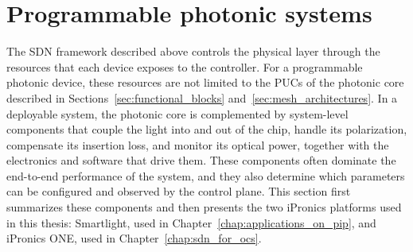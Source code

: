 %


%

\section{Programmable photonic systems}\label{sub:pip_systems}
The SDN framework described above controls the physical layer through the resources that each device exposes to the controller.
For a programmable photonic device, these resources are not limited to the PUCs of the photonic core described in Sections~\ref{sec:functional_blocks} and~\ref{sec:mesh_architectures}.
In a deployable system, the photonic core is complemented by system-level components that couple the light into and out of the chip, handle its polarization, compensate its insertion loss, and monitor its optical power, together with the electronics and software that drive them.
These components often dominate the end-to-end performance of the system, and they also determine which parameters can be configured and observed by the control plane.
This section first summarizes these components and then presents the two iPronics platforms used in this thesis: Smartlight, used in Chapter~\ref{chap:applications_on_pip}, and iPronics ONE, used in Chapter~\ref{chap:sdn_for_ocs}.


